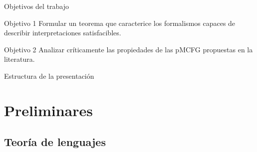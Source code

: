 \documentclass{beamer}
\begin{document}
\begin{frame}{Objetivos del trabajo}

    \pause

    \begin{block}{Objetivo 1}
        Formular un teorema que caracterice los formalismos capaces de describir interpretaciones satisfacibles.
    \end{block}

    \pause

    \begin{block}{Objetivo 2}
        Analizar críticamente las propiedades de las pMCFG propuestas en la literatura.
    \end{block}

\end{frame}

\begin{frame}{Estructura de la presentación}
    \tableofcontents
\end{frame}

\section{Preliminares}

\subsection{Teoría de lenguajes}
\end{document}
